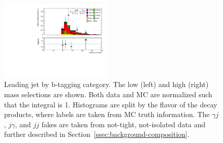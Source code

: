 \begin{figure}[p]
  \includegraphics[width=0.48\textwidth]{chapters/chapter5_yybb/images/data_MC_comparison/h_SR_h_2t_nominal_leadingJet_pt.pdf}
  \caption[Leading jet \pt by \btagging category]{Leading jet \pt by b-tagging category. The low (left) and high (right) mass selections are shown. Both data and MC are normalized such that the integral is 1. Histograms are split by the flavor of the \Hbb decay products, where labels are taken from \gls{MC} truth information. The $\gamma j$, $j\gamma$, and $jj$ fakes are taken from not-tight, not-isolated data and further described in Section~\ref{ssec:background-composition}.
  \label{fig:jet_l_pt}}
\end{figure}

